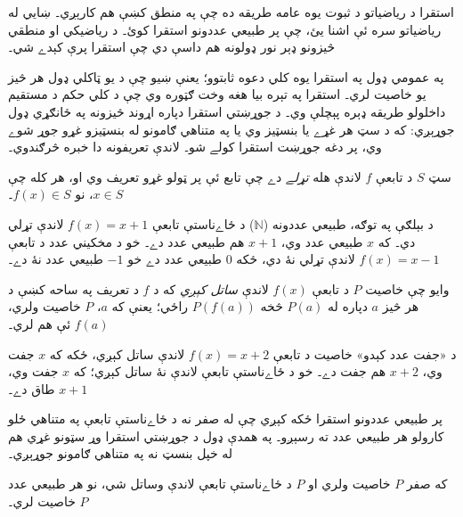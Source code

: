 \documentclass[../../../include/open-logic-section]{subfiles}
\begin{document}


\begin{explain}
استقرا د رياضياتو د ثبوت يوه عامه طريقه ده چې په منطق کښې هم کارېږي۔ ښايي له رياضياتو سره ئې اشنا يئ، چې پر طبيعي عددونو استقرا کوئ۔ د رياضيکي او منطقي څيزونو ډېر نور ډولونه هم داسې دي چې استقرا پرې کېدے شي۔

په عمومي ډول په استقرا يوه کلي دعوه ثابتوو؛ يعنې ښيو چې د يو ټاکلي ډول هر څيز يو خاصيت لري۔ استقرا په تېره بيا هغه وخت ګټوره وي چې د کلي حکم د مستقيم داخلولو طريقه ډېره پېچلې وي۔ د جوړښتي استقرا دپاره اړوند څيزونه په ځانګړي ډول جوړېږي: که د سټ هر غړے يا بنسټيز وي يا په متناهي ګامونو له بنسټيزو غړو جوړ شوے وي، پر دغه جوړښت استقرا کولے شو۔ لاندې تعريفونه دا خبره څرګندوي۔
\end{explain}

\begin{defn}
سټ $S$ د تابعې $f$ لاندې هله \emph{تړلے} دے چې تابع ئې پر ټولو غړو تعريف وي او، هر کله چې $x \in
S$، نو $f(x) \in S$۔
\end{defn}

\begin{explain}
د بېلګې په توګه، طبيعي عددونه ($\mathbb{N}$) د ځاے‌ناستې تابعې $f(x) = x+1$ لاندې تړلي دي۔ که $x$ طبيعي عدد وي، $x+1$ هم طبيعي عدد دے۔ خو د مخکيني عدد د تابعې $f(x) = x-1$ لاندې تړلي نۀ دي، ځکه $0$ طبيعي عدد دے خو $-1$ طبيعي عدد نۀ دے۔
\end{explain}

\begin{defn}
وايو چې خاصيت $P$ د تابعې $f(x)$ لاندې \emph{ساتل کېږي} که د $f$ د تعريف په ساحه کښې د هر څيز $a$ دپاره له $P(a)$ څخه $P(f(a))$ راځي؛ يعنې که $a$، $P$ خاصيت ولري، $f(a)$ ئې هم لري۔
\end{defn}

\begin{explain}
د «جفت عدد کېدو» خاصيت د تابعې $f(x) = x+2$ لاندې ساتل کېږي، ځکه که $x$ جفت وي، $x+2$ هم جفت دے۔ خو د ځاے‌ناستې تابعې لاندې نۀ ساتل کېږي؛ که $x$ جفت وي، $x+1$ طاق دے۔

پر طبيعي عددونو استقرا ځکه کېږي چې له صفر نه د ځاے‌ناستې تابعې په متناهي ځلو کارولو هر طبيعي عدد ته رسېږو۔ په همدې ډول د جوړښتي استقرا وړ سټونو غړي هم له خپل بنسټ نه په متناهي ګامونو جوړېږي۔
\end{explain}

\begin{defn}
که صفر $P$ خاصيت ولري او $P$ د ځاے‌ناستې تابعې لاندې وساتل شي، نو هر طبيعي عدد $P$ خاصيت لري۔
\end{defn}
\end{document}
